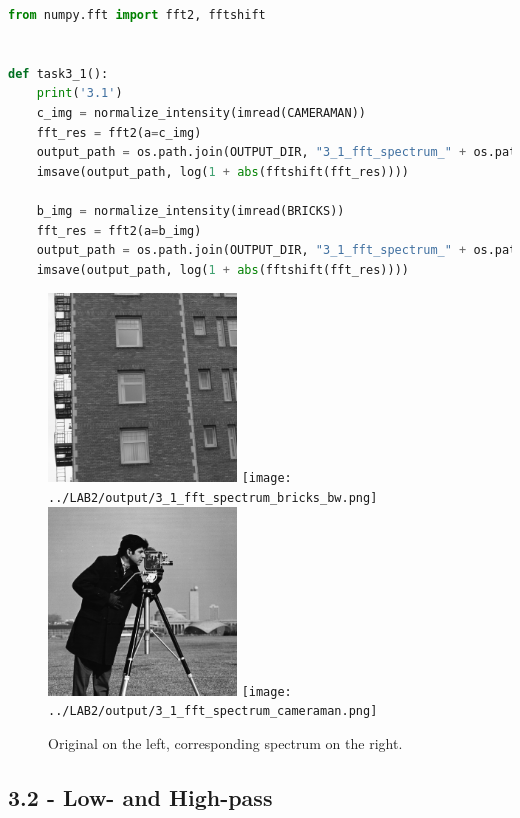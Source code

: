 \begin{lstlisting}[language=Python, label=fourier_spectrum, caption=Fourier transform and spectrum image]
from numpy.fft import fft2, fftshift


def task3_1():
    print('3.1')
    c_img = normalize_intensity(imread(CAMERAMAN))
    fft_res = fft2(a=c_img)
    output_path = os.path.join(OUTPUT_DIR, "3_1_fft_spectrum_" + os.path.split(CAMERAMAN)[-1])
    imsave(output_path, log(1 + abs(fftshift(fft_res))))

    b_img = normalize_intensity(imread(BRICKS))
    fft_res = fft2(a=b_img)
    output_path = os.path.join(OUTPUT_DIR, "3_1_fft_spectrum_" + os.path.split(BRICKS)[-1])
    imsave(output_path, log(1 + abs(fftshift(fft_res))))
\end{lstlisting}

\begin{figure}[h!]
    \centering
    \includegraphics[width=5cm]{../LAB2/img/bricks_bw.png}
    \texttt{[image: ../LAB2/output/3\_1\_fft\_spectrum\_bricks\_bw.png]} \\
    \includegraphics[width=5cm]{../LAB2/img/cameraman.png}
    \texttt{[image: ../LAB2/output/3\_1\_fft\_spectrum\_cameraman.png]}
    \caption{Original on the left, corresponding spectrum on the right.}
    \label{fft_spectrum_image}
\end{figure}

\newpage
\subsection*{3.2 - Low- and High-pass}

